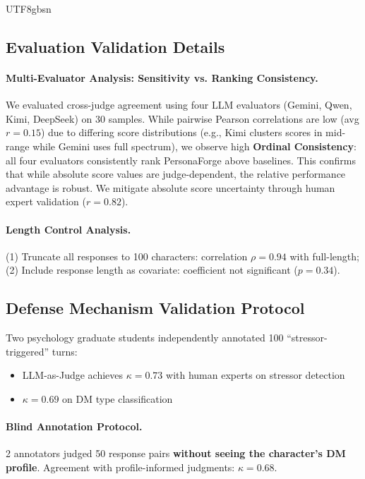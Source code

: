 \documentclass[11pt]{article}
\begin{document}
\begin{CJK*}{UTF8}{gbsn}
\subsection{Evaluation Validation Details}
\label{sec:eval_validation}

\paragraph{Multi-Evaluator Analysis: Sensitivity vs. Ranking Consistency.}
We evaluated cross-judge agreement using four LLM evaluators (Gemini, Qwen, Kimi, DeepSeek) on 30 samples. While pairwise Pearson correlations are low (avg $r=0.15$) due to differing score distributions (e.g., Kimi clusters scores in mid-range while Gemini uses full spectrum), we observe high \textbf{Ordinal Consistency}: all four evaluators consistently rank PersonaForge above baselines. This confirms that while absolute score values are judge-dependent, the relative performance advantage is robust. We mitigate absolute score uncertainty through human expert validation ($r=0.82$).

\paragraph{Length Control Analysis.} (1) Truncate all responses to 100 characters: correlation $\rho=0.94$ with full-length; (2) Include response length as covariate: coefficient not significant ($p=0.34$).

\subsection{Defense Mechanism Validation Protocol}
\label{sec:dm_validation}

Two psychology graduate students independently annotated 100 ``stressor-triggered'' turns:
\begin{itemize}
    \item LLM-as-Judge achieves $\kappa=0.73$ with human experts on stressor detection
    \item $\kappa=0.69$ on DM type classification
\end{itemize}

\paragraph{Blind Annotation Protocol.} 2 annotators judged 50 response pairs \textbf{without seeing the character's DM profile}. Agreement with profile-informed judgments: $\kappa = 0.68$.


\end{CJK*}
\end{document}
